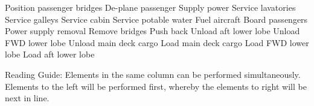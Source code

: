 Position passenger bridges
	De-plane passenger
	Supply power
		Service lavatories
		Service galleys
		Service cabin
		Service potable water
		Fuel aircraft
			Board passengers
				Power supply removal
				Remove bridges
					Push back
	Unload aft lower lobe
	Unload FWD lower lobe
		Unload main deck cargo
			Load main deck cargo
			Load FWD lower lobe
			Load aft lower lobe
			
			
Reading Guide:
	Elements in the same column can be performed simultaneously. 
	Elements to the left will be performed first, whereby the elements to right will be next in line.